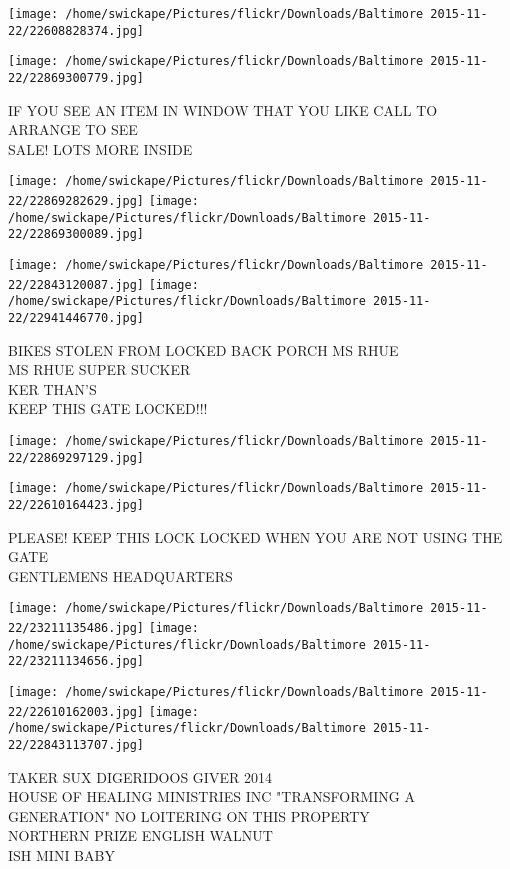 \documentclass[10pt,letterpaper]{article}
\begin{document}
\texttt{[image: /home/swickape/Pictures/flickr/Downloads/Baltimore 2015-11-22/22608828374.jpg]}

\vspace{0.25in}
\texttt{[image: /home/swickape/Pictures/flickr/Downloads/Baltimore 2015-11-22/22869300779.jpg]}

IF YOU SEE AN ITEM IN WINDOW THAT YOU LIKE CALL TO ARRANGE TO SEE\\
SALE!  LOTS MORE INSIDE\\
\pagebreak

\texttt{[image: /home/swickape/Pictures/flickr/Downloads/Baltimore 2015-11-22/22869282629.jpg]}
\texttt{[image: /home/swickape/Pictures/flickr/Downloads/Baltimore 2015-11-22/22869300089.jpg]}

\texttt{[image: /home/swickape/Pictures/flickr/Downloads/Baltimore 2015-11-22/22843120087.jpg]}
\texttt{[image: /home/swickape/Pictures/flickr/Downloads/Baltimore 2015-11-22/22941446770.jpg]}

BIKES STOLEN FROM LOCKED BACK PORCH MS RHUE\\
MS RHUE SUPER SUCKER\\
KER THAN'S\\
KEEP THIS GATE LOCKED!!!\\
\pagebreak

\texttt{[image: /home/swickape/Pictures/flickr/Downloads/Baltimore 2015-11-22/22869297129.jpg]}

\vspace{0.25in}
\texttt{[image: /home/swickape/Pictures/flickr/Downloads/Baltimore 2015-11-22/22610164423.jpg]}

PLEASE!  KEEP THIS LOCK LOCKED WHEN YOU ARE NOT USING THE GATE\\
GENTLEMENS HEADQUARTERS\\
\pagebreak

\texttt{[image: /home/swickape/Pictures/flickr/Downloads/Baltimore 2015-11-22/23211135486.jpg]}
\texttt{[image: /home/swickape/Pictures/flickr/Downloads/Baltimore 2015-11-22/23211134656.jpg]}

\texttt{[image: /home/swickape/Pictures/flickr/Downloads/Baltimore 2015-11-22/22610162003.jpg]}
\texttt{[image: /home/swickape/Pictures/flickr/Downloads/Baltimore 2015-11-22/22843113707.jpg]}

TAKER SUX DIGERIDOOS GIVER 2014\\
HOUSE OF HEALING MINISTRIES INC "TRANSFORMING A GENERATION" NO LOITERING ON THIS PROPERTY\\
NORTHERN PRIZE ENGLISH WALNUT\\
ISH MINI BABY\\
\pagebreak
\end{document}

